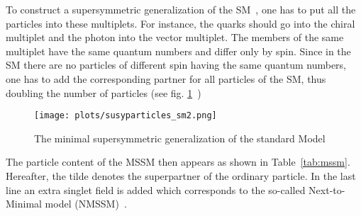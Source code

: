 \documentclass{cernyrep}
\begin{document}
To construct a supersymmetric generalization of the SM~\cite{MSSM}, one
has to put all the particles into these multiplets. For
instance, the quarks should go into the chiral multiplet and
the photon into the vector multiplet. The members of the same multiplet have the same quantum numbers and differ only by spin. Since in the SM there are no particles of different spin having the same quantum numbers, one has to add the corresponding partner for all particles of the SM, thus doubling the number of particles (see fig. \ref{content}~\cite{content})
\begin{figure}[htb]
\begin{center}
\leavevmode
\texttt{[image: plots/susyparticles\_sm2.png]}
\end{center}\vspace{-0.1cm}
\caption{The minimal supersymmetric generalization of the standard Model}
\label{content}
\end{figure}
The particle content of the MSSM then appears as shown in 
Table~\ref{tab:mssm}. Hereafter, the tilde denotes the
superpartner of the ordinary particle. In the last line an extra singlet field is added which corresponds to the so-called Next-to-Minimal model  (NMSSM)~\cite{NMSSM}.
\end{document}
